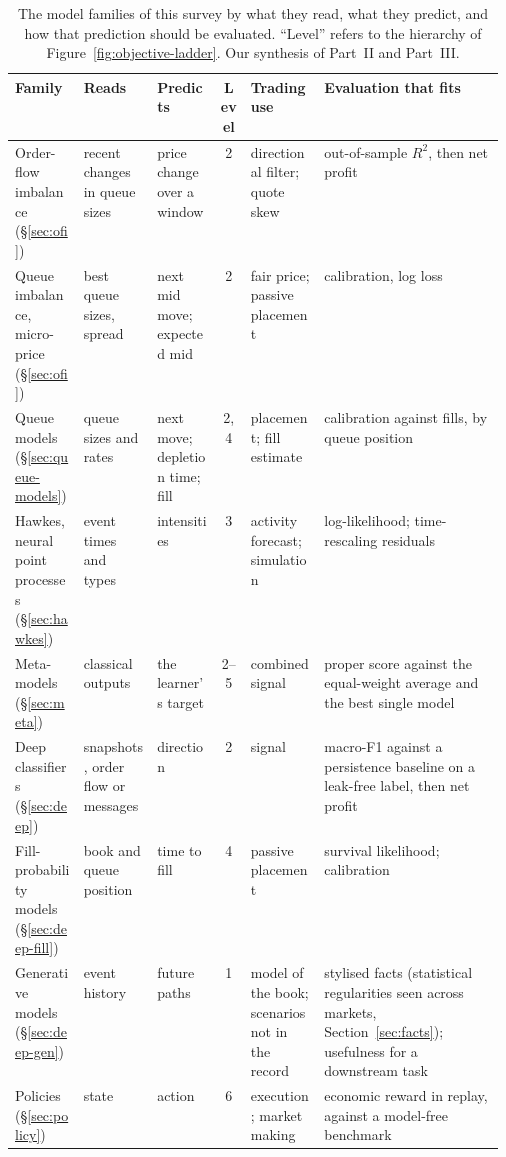 \begin{table}[!htbp]
\centering\footnotesize
\caption{The model families of this survey by what they read, what they predict, and how that prediction should be
evaluated. ``Level'' refers to the hierarchy of Figure~\ref{fig:objective-ladder}. Our synthesis of Part~II and
Part~III.}
\label{tab:objective-matrix}
\setlength{\tabcolsep}{3pt}
\begin{tabularx}{\linewidth}{>{\raggedright\arraybackslash}p{0.14\linewidth}>{\raggedright\arraybackslash}p{0.15\linewidth}>{\raggedright\arraybackslash}p{0.13\linewidth}c>{\raggedright\arraybackslash}p{0.15\linewidth}>{\raggedright\arraybackslash}X}
\toprule
Family & Reads & Predicts & Level & Trading use & Evaluation that fits \\
\midrule
Order-flow imbalance (\S\ref{sec:ofi}) & recent changes in queue sizes & price change over a window & 2 & directional filter; quote skew & out-of-sample $R^2$, then net profit \\
Queue imbalance, micro-price (\S\ref{sec:ofi}) & best queue sizes, spread & next mid move; expected mid & 2 & fair price; passive placement & calibration, log loss \\
Queue models (\S\ref{sec:queue-models}) & queue sizes and rates & next move; depletion time; fill & 2, 4 & placement; fill estimate & calibration against fills, by queue position \\
Hawkes, neural point processes (\S\ref{sec:hawkes}) & event times and types & intensities & 3 & activity forecast; simulation & log-likelihood; time-rescaling residuals \\
Meta-models (\S\ref{sec:meta}) & classical outputs & the learner's target & 2--5 & combined signal & proper score against the equal-weight average and the best single model \\
Deep classifiers (\S\ref{sec:deep}) & snapshots, order flow or messages & direction & 2 & signal & macro-F1 against a persistence baseline on a leak-free label, then net profit \\
Fill-probability models (\S\ref{sec:deep-fill}) & book and queue position & time to fill & 4 & passive placement & survival likelihood; calibration \\
Generative models (\S\ref{sec:deep-gen}) & event history & future paths & 1 & model of the book; scenarios not in the record & stylised facts (statistical regularities seen across markets, Section~\ref{sec:facts}); usefulness for a downstream task \\
Policies (\S\ref{sec:policy}) & state & action & 6 & execution; market making & economic reward in replay, against a model-free benchmark \\
\bottomrule
\end{tabularx}
\end{table}

